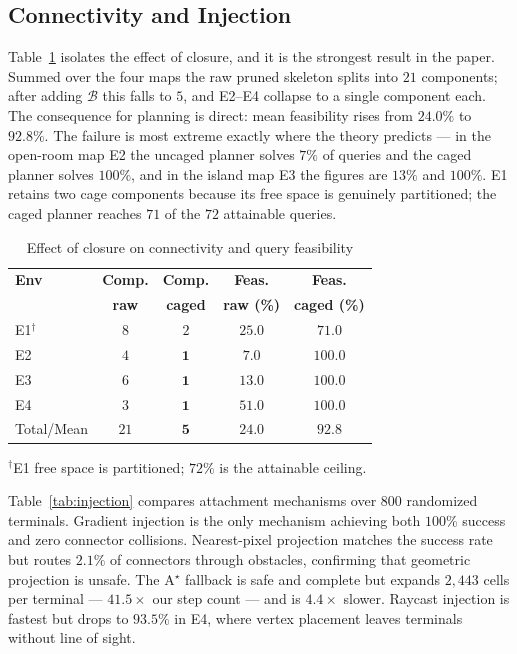 \documentclass[conference]{IEEEtran}
\begin{document}
\subsection{Connectivity and Injection}
Table~\ref{tab:connectivity} isolates the effect of closure, and it is the strongest result in the paper. Summed over the four maps the raw pruned skeleton splits into $21$ components; after adding $\mathcal{B}$ this falls to $5$, and E2--E4 collapse to a single component each. The consequence for planning is direct: mean feasibility rises from $24.0\%$ to $92.8\%$. The failure is most extreme exactly where the theory predicts --- in the open-room map E2 the uncaged planner solves $7\%$ of queries and the caged planner solves $100\%$, and in the island map E3 the figures are $13\%$ and $100\%$. E1 retains two cage components because its free space is genuinely partitioned; the caged planner reaches $71$ of the $72$ attainable queries.
\begin{table}[htbp]
\caption{Effect of closure on connectivity and query feasibility}
\label{tab:connectivity}
\begin{center}
\begin{tabular}{@{}lcccc@{}}
\toprule
\textbf{Env} & \textbf{Comp.} & \textbf{Comp.} & \textbf{Feas.} & \textbf{Feas.} \\
 & \textbf{raw} & \textbf{caged} & \textbf{raw (\%)} & \textbf{caged (\%)} \\ \midrule
E1$^{\dagger}$ & $8$ & $2$ & $25.0$ & $71.0$ \\
E2 & $4$ & $\mathbf{1}$ & $7.0$ & $\mathbf{100.0}$ \\
E3 & $6$ & $\mathbf{1}$ & $13.0$ & $\mathbf{100.0}$ \\
E4 & $3$ & $\mathbf{1}$ & $51.0$ & $\mathbf{100.0}$ \\ \midrule
Total/Mean & $21$ & $\mathbf{5}$ & $24.0$ & $\mathbf{92.8}$ \\ \bottomrule
\end{tabular}
\end{center}
\footnotesize $^{\dagger}$E1 free space is partitioned; $72\%$ is the attainable ceiling.
\end{table}
Table~\ref{tab:injection} compares attachment mechanisms over $800$ randomized terminals. Gradient injection is the only mechanism achieving both $100\%$ success and zero connector collisions. Nearest-pixel projection matches the success rate but routes $2.1\%$ of connectors through obstacles, confirming that geometric projection is unsafe. The A$^\star$ fallback is safe and complete but expands $2{,}443$ cells per terminal --- $41.5\times$ our step count --- and is $4.4\times$ slower. Raycast injection is fastest but drops to $93.5\%$ in E4, where vertex placement leaves terminals without line of sight.
\end{document}
